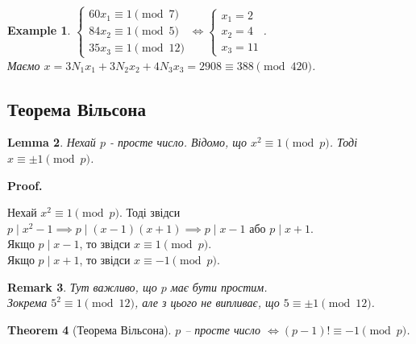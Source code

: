 \documentclass[a4paper, 14pt]{extarticle}
\makeatletter
\theoremstyle{theoremdd}
\newtheorem{theorem}{Theorem}[subsection]
\theoremstyle{theoremdd}
\theoremstyle{theoremdd}
\theoremstyle{theoremdd}
\newtheorem{example}[theorem]{Example}
\theoremstyle{theoremdd}
\theoremstyle{theoremdd}
\newtheorem{remark}[theorem]{Remark}
\theoremstyle{theoremdd}
\newtheorem{lemma}[theorem]{Lemma}
\theoremstyle{theoremdd}
\def\qed{$\blacksquare$}
\renewenvironment{proof}[1][Proof.\\]{\par
\pushQED{\hfill \qed}%
\normalfont \topsep6\p@\@plus6\p@\relax
\trivlist
\item\relax
{\bfseries
#1\@addpunct{.}}\hspace\labelsep\ignorespaces
}{%
\popQED\endtrivlist\@endpefalse
}
\makeatother
\begin{document}
\begin{example}
$\begin{cases}
60x_1 \equiv 1 \pmod 7 \\
84x_2 \equiv 1 \pmod 5 \\
35x_3 \equiv 1 \pmod {12}
\end{cases} \iff \begin{cases}
x_1 = 2 \\
x_2 = 4 \\
x_3 = 11
\end{cases}$.\\
Маємо $x = 3N_1x_1 + 3N_2x_2 + 4N_3x_3 = 2908 \equiv 388 \pmod {420}$.
\end{example}


\subsection{Теорема Вільсона}
\begin{lemma}
Нехай $p$ - просте число. Відомо, що $x^2 \equiv 1 \pmod p$. Тоді $x \equiv \pm 1 \pmod p$.
\end{lemma}

\begin{proof}
Нехай $x^2 \equiv 1 \pmod p$. Тоді звідси $p \mid x^2 - 1 \implies p \mid (x-1)(x+1) \implies p \mid x-1$ або $p \mid x+1$.\\
Якщо $p \mid x-1$, то звідси $x \equiv 1 \pmod p$.\\
Якщо $p \mid x+1$, то звідси $x \equiv -1 \pmod p$.
\end{proof}

\begin{remark}
Тут важливо, що $p$ має бути простим.\\
Зокрема $5^2 \equiv 1 \pmod {12}$, але з цього не випливає, що $5 \equiv \pm 1 \pmod {12}$.
\end{remark}

\begin{theorem}[Теорема Вільсона]
$p$ -- просте число $\iff (p-1)! \equiv -1 \pmod p$.
\end{theorem}
\end{document}
